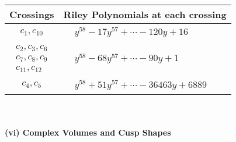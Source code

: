 \documentclass[1p]{elsarticle_modified}
\theoremstyle{definition}
\begin{document}
\begin{tabular}{m{50pt}|m{274pt}}
Crossings & \hspace{64pt}Riley Polynomials at each crossing \\
\hline $$\begin{aligned}c_{1},c_{10}\end{aligned}$$&$\begin{aligned}
&y^{58}-17 y^{57}+\cdots-120 y+16
\end{aligned}$\\
\hline $$\begin{aligned}c_{2},c_{3},c_{6}\\c_{7},c_{8},c_{9}\\c_{11},c_{12}\end{aligned}$$&$\begin{aligned}
&y^{58}-68 y^{57}+\cdots-90 y+1
\end{aligned}$\\
\hline $$\begin{aligned}c_{4},c_{5}\end{aligned}$$&$\begin{aligned}
&y^{58}+51 y^{57}+\cdots-36463 y+6889
\end{aligned}$\\
\hline
\end{tabular}\\~\\
\newpage\flushleft \textbf{(vi) Complex Volumes and Cusp Shapes}
\end{document}
